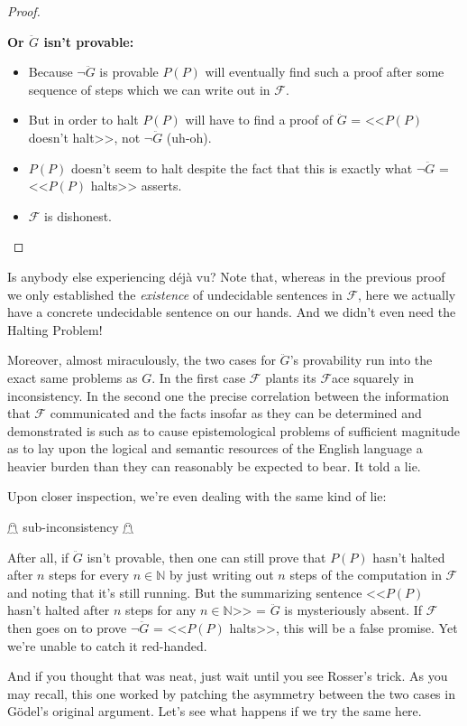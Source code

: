 \documentclass{article}
\theoremstyle{theorem}
\newcommand{\nameditem}[1]{\item\textbf{#1}}
\newcommand{\impl}{\item[$\Rightarrow$]}
\begin{document}
\begin{proof}
\begin{description}
\begin{description}
\nameditem{Or $\ddot{G}$ isn't provable:}
\begin{itemize}
\impl Because $\neg \ddot{G}$ is provable $P(P)$ will eventually find such a proof after some sequence of steps which we can write out in $\mathcal{F}$.
\impl But in order to halt $P(P)$ will have to find a proof of $\ddot{G}$ = <<$P(P)$ doesn't halt>>, not $\neg \ddot{G}$ (uh-oh).
\impl $P(P)$ doesn't seem to halt despite the fact that this is exactly what $\neg \ddot{G}$ = <<$P(P)$ halts>> asserts.
\impl $\mathcal{F}$ is dishonest. \lightning
\end{itemize}
\end{description}
\end{description}
\end{proof}

Is anybody else experiencing déjà vu? Note that, whereas in the previous proof we only established the \textit{existence} of undecidable sentences in $\mathcal{F}$, here we actually have a concrete undecidable sentence on our hands. And we didn't even need the Halting Problem!

Moreover, almost miraculously, the two cases for $\ddot{G}$'s provability run into the exact same problems as $G$. In the first case $\mathcal{F}$ plants its $\mathcal{F}$ace squarely in inconsistency. In the second one the precise correlation between the information that $\mathcal{F}$ communicated and the facts insofar as they can be determined and demonstrated is such as to cause epistemological problems of sufficient magnitude as to lay upon the logical and semantic resources of the English language a heavier burden than they can reasonably be expected to bear. It told a lie.\cite{yes-prime-minister}

Upon closer inspection, we're even dealing with the same kind of lie:
\begin{center}
$\mathghost$ sub-inconsistency $\mathghost$
\end{center}
After all, if $\ddot{G}$ isn't provable, then one can still prove that $P(P)$ hasn't halted after $n$ steps for every $n\in\mathbb{N}$ by just writing out $n$ steps of the computation in $\mathcal{F}$ and noting that it's still running. But the summarizing sentence <<$P(P)$ hasn't halted after $n$ steps for any $n\in\mathbb{N}$>> = $\ddot{G}$ is mysteriously absent. If $\mathcal{F}$ then goes on to prove $\neg \ddot{G}$ = <<$P(P)$ halts>>, this will be a false promise. Yet we're unable to catch it red-handed.

And if you thought that was neat, just wait until you see Rosser's trick. As you may recall, this one worked by patching the asymmetry between the two cases in Gödel's original argument. Let's see what happens if we try the same here.
\end{document}
